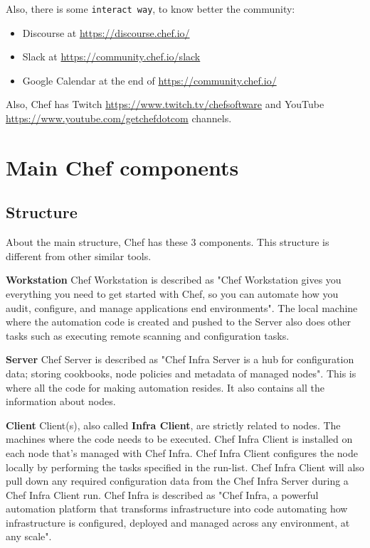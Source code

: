 \documentclass[12pt,a4paper,openright,twoside]{book}
\begin{document}
Also, there is some \texttt{interact way}, to know better the community:

\begin{itemize}
    \item Discourse\newline
    at \url{https://discourse.chef.io/}
    \item Slack\newline
    at \url{https://community.chef.io/slack}
    \item Google Calendar\newline
    at the end of \url{https://community.chef.io/}
\end{itemize}

Also, Chef has Twitch \url{https://www.twitch.tv/chefsoftware} and YouTube \url{https://www.youtube.com/getchefdotcom} channels.

\section{Main Chef components}

\subsection{Structure}
About the main structure, Chef has these 3 components.
This structure is different from other similar tools.

\textbf{Workstation}\newline
Chef Workstation is described as\cite{chefWorkstation}
"Chef Workstation gives you everything you need to get started with Chef, so you can automate how you audit, configure, and manage applications end environments".
The local machine where the automation code is created and pushed to the Server also does other tasks such as executing remote scanning and configuration tasks.


\textbf{Server}\newline
Chef Server is described as\cite{chefServer}
"Chef Infra Server is a hub for configuration data; storing cookbooks, node policies and metadata of managed nodes".
This is where all the code for making automation resides. It also contains all the information about nodes.


\textbf{Client}\newline
Client(s), also called \textbf{Infra Client}, are strictly related to nodes. The machines where the code needs to be executed.
Chef Infra Client is installed on each node that's managed with Chef Infra. Chef Infra Client configures the node locally by performing the tasks specified in the run-list.
Chef Infra Client will also pull down any required configuration data from the Chef Infra Server during a Chef Infra Client run.
Chef Infra is described as\cite{chefInfra}
"Chef Infra, a powerful automation platform that transforms infrastructure into code automating how infrastructure is configured, deployed and managed across any environment, at any scale".
\newline
\end{document}
